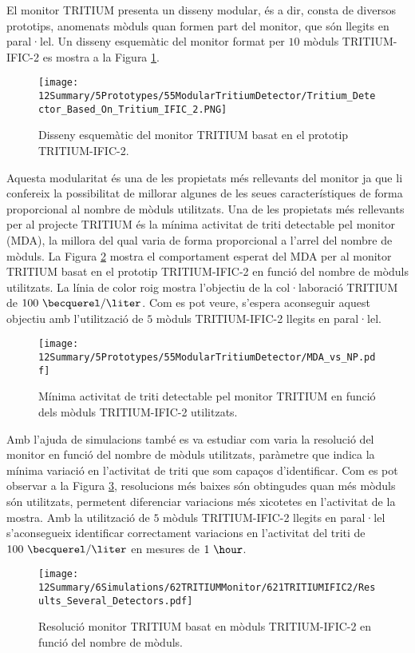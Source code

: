 El monitor TRITIUM presenta un disseny modular, és a dir, consta de diversos prototips, anomenats mòduls quan formen part del monitor, que són llegits en paral·lel. Un disseny esquemàtic del monitor format per $10$ mòduls TRITIUM-IFIC-2 es mostra a la Figura \ref{fig:10TritiumMonitorIFIC2}.

\begin{figure}[h]
\centering
\texttt{[image: 12Summary/5Prototypes/55ModularTritiumDetector/Tritium\_Detector\_Based\_On\_Tritium\_IFIC\_2.PNG]}
\caption{Disseny esquemàtic del monitor TRITIUM basat en el prototip TRITIUM-IFIC-2.\label{fig:10TritiumMonitorIFIC2}}
\end{figure}

Aquesta modularitat és una de les propietats més rellevants del monitor ja que li confereix la possibilitat de millorar algunes de les seues característiques de forma proporcional al nombre de mòduls utilitzats. Una de les propietats més rellevants per al projecte TRITIUM és la mínima activitat de triti detectable pel monitor (MDA), la millora del qual varia de forma proporcional a l'arrel del nombre de mòduls. La Figura \ref{fig:MDATritiumMonitorIFIC2} mostra el comportament esperat del MDA per al monitor TRITIUM basat en el prototip TRITIUM-IFIC-2 en funció del nombre de mòduls utilitzats. La línia de color roig mostra l'objectiu de la col·laboració TRITIUM de $100~\becquerel/\liter$. Com es pot veure, s'espera aconseguir aquest objectiu amb l'utilització de $5$ mòduls TRITIUM-IFIC-2 llegits en paral·lel.

\begin{figure}[h]
\centering
\texttt{[image: 12Summary/5Prototypes/55ModularTritiumDetector/MDA\_vs\_NP.pdf]}
\caption{Mínima activitat de triti detectable pel monitor TRITIUM en funció dels mòduls TRITIUM-IFIC-2 utilitzats.\label{fig:MDATritiumMonitorIFIC2}}
\end{figure}

Amb l'ajuda de simulacions també es va estudiar com varia la resolució del monitor en funció del nombre de mòduls utilitzats, paràmetre que indica la mínima variació en l'activitat de triti que som capaços d'identificar. Com es pot observar a la Figura \ref{fig:ResolucioTritiumMonitorIFIC2},  resolucions més baixes són obtingudes quan més mòduls són utilitzats, permetent diferenciar variacions més xicotetes en l'activitat de la mostra. Amb la utilització de $5$ mòduls TRITIUM-IFIC-2 llegits en paral·lel s'aconsegueix identificar correctament variacions en l'activitat del triti de $100~\becquerel/\liter$ en mesures de $1~\hour$.

\begin{figure}[h]
\centering
\texttt{[image: 12Summary/6Simulations/62TRITIUMMonitor/621TRITIUMIFIC2/Results\_Several\_Detectors.pdf]}
\caption{Resolució monitor TRITIUM basat en mòduls TRITIUM-IFIC-2 en funció del nombre de mòduls.\label{fig:ResolucioTritiumMonitorIFIC2}}
\end{figure}
